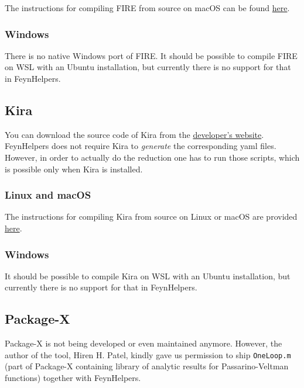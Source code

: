 \documentclass[../FeynHelpersManual.tex]{subfiles}
\begin{document}
The instructions for compiling FIRE from source on macOS can be found
\href{https://bitbucket.org/feynmanIntegrals/fire/issues/10/issue-of-the-installation-on-macos}{here}.

\subsubsection{Windows}\label{windows-1}

There is no native Windows port of FIRE. It should be possible to
compile FIRE on WSL with an Ubuntu installation, but currently there is
no support for that in FeynHelpers.

\subsection{Kira}\label{kira}

You can download the source code of Kira from the
\href{https://gitlab.com/kira-pyred/kira}{developer's website}.
FeynHelpers does not require Kira to \emph{generate} the corresponding
yaml files. However, in order to actually do the reduction one has to
run those scripts, which is possible only when Kira is installed.

\subsubsection{Linux and macOS}\label{linux-and-macos}

The instructions for compiling Kira from source on Linux or macOS are
provided \href{https://gitlab.com/kira-pyred/kira}{here}.

\subsubsection{Windows}\label{windows-2}

It should be possible to compile Kira on WSL with an Ubuntu
installation, but currently there is no support for that in FeynHelpers.

\subsection{Package-X}\label{package-x}

Package-X is not being developed or even maintained anymore. However,
the author of the tool, Hiren H. Patel, kindly gave us permission to
ship \texttt{OneLoop.m} (part of Package-X containing library of
analytic results for Passarino-Veltman functions) together with
FeynHelpers.
\end{document}
